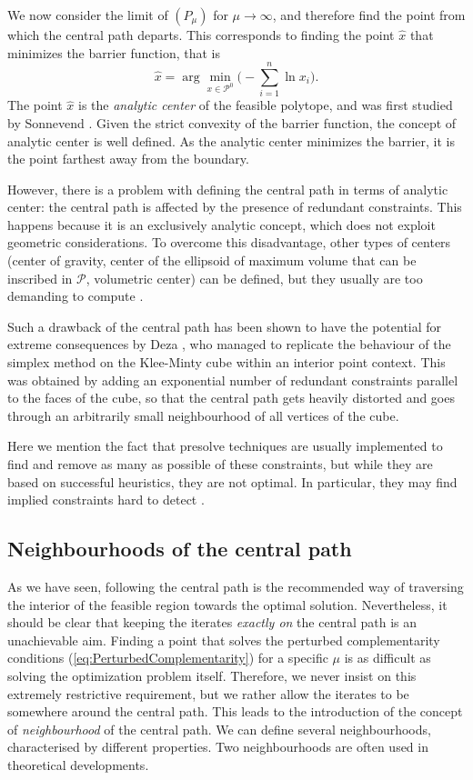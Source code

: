 We now consider
the limit of $(P_\mu)$ for $\mu \to \infty$, and therefore
find the point from which the central path departs.
This corresponds to finding the point $\hat{x}$ 
that minimizes the barrier function, that is
\[
  \hat{x} = \arg \min_{x \in \mathcal{P}^0} \big(-\sum_{i=1}^n \ln x_i \big).
\]
The point $\hat{x}$ is the {\em analytic center} of the feasible polytope, 
and was first studied by Sonnevend \cite{Sonnevend86}.
Given the strict convexity of the barrier function, the concept 
of analytic center is well defined.
As the analytic center minimizes the barrier, it
is the point farthest away from the boundary.

However, there is a problem with defining the central path in terms
of analytic center: the central path is affected by the presence of 
redundant constraints. 
This happens because it is an exclusively analytic concept, which does
not exploit geometric considerations.
To overcome this disadvantage,
other types of centers (center of gravity, center of the ellipsoid of 
maximum volume that can be inscribed in $\mathcal{P}$, volumetric center) 
can be defined, but they usually are too demanding to compute 
\cite{Gonzaga92}. 

Such a drawback of the central path has been shown to 
have the potential for extreme
consequences by Deza \etal \cite{DezaNematollahiPeyghamiTerlaky},
who managed to replicate the behaviour of the simplex method
on the Klee-Minty cube within an interior point context. 
This was obtained by adding an exponential
number of redundant constraints parallel to the faces of the cube, so
that the central path gets heavily distorted and goes through
an arbitrarily small neighbourhood of all vertices of the cube.

Here we mention the fact that presolve
techniques are usually implemented to find and remove as many as
possible of these constraints, but while they are based on successful
heuristics, they are not optimal. In particular, they may find 
implied constraints hard to detect \cite{CartisGould}.

%
%
\subsection{Neighbourhoods of the central path}
\label{sec:Neighbourhoods}

As we have seen, following the central path is the recommended
way of traversing the interior of the feasible region towards
the optimal solution. Nevertheless, it should be clear that keeping the
iterates {\em exactly on} the central path is an unachievable aim.
Finding a point that solves the perturbed complementarity conditions 
(\ref{eq:PerturbedComplementarity}) for a specific $\mu$ 
is as difficult as solving the optimization problem itself.
%
Therefore, we never insist on this extremely restrictive requirement,
but we rather allow the iterates to be somewhere around the central path.
This leads to the introduction of the concept of
{\em neighbourhood} of the central path. 
We can define several neighbourhoods, characterised
by different properties.
Two neighbourhoods are often used in theoretical developments.

